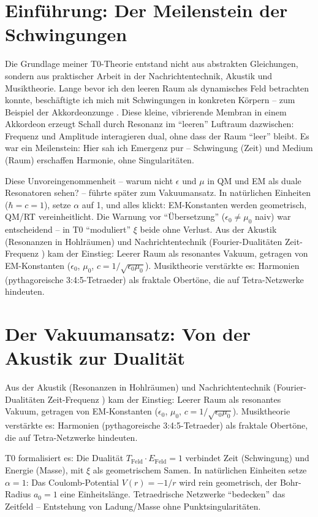 \section{Einführung: Der Meilenstein der Schwingungen}
	Die Grundlage meiner T0-Theorie entstand nicht aus abstrakten Gleichungen, sondern aus praktischer Arbeit in der Nachrichtentechnik, Akustik und Musiktheorie. Lange bevor ich den leeren Raum als dynamisches Feld betrachten konnte, beschäftigte ich mich mit Schwingungen in konkreten Körpern – zum Beispiel der Akkordeonzunge \cite{ricot2005}. Diese kleine, vibrierende Membran in einem Akkordeon erzeugt Schall durch Resonanz im ``leeren'' Luftraum dazwischen: Frequenz und Amplitude interagieren dual, ohne dass der Raum ``leer'' bleibt. Es war ein Meilenstein: Hier sah ich Emergenz pur – Schwingung (Zeit) und Medium (Raum) erschaffen Harmonie, ohne Singularitäten.
	
	Diese Unvoreingenommenheit – warum nicht $\epsilon$ und $\mu$ in QM und EM als duale Resonatoren sehen? – führte später zum Vakuumansatz. In natürlichen Einheiten ($\hbar = c = 1$), setze $\alpha$ auf 1, und alles klickt: EM-Konstanten werden geometrisch, QM/RT vereinheitlicht. Die Warnung vor ``Übersetzung'' ($\epsilon_0 \neq \mu_0$ naiv) war entscheidend – in T0 ``moduliert'' $\xi$ beide ohne Verlust. Aus der Akustik (Resonanzen in Hohlräumen) und Nachrichtentechnik (Fourier-Dualitäten Zeit-Frequenz \cite{stanfordEE261}) kam der Einstieg: Leerer Raum als resonantes Vakuum, getragen von EM-Konstanten ($\epsilon_0$, $\mu_0$, $c = 1/\sqrt{\epsilon_0 \mu_0}$). Musiktheorie verstärkte es: Harmonien (pythagoreische 3:4:5-Tetraeder) als fraktale Obertöne, die auf Tetra-Netzwerke hindeuten.
	
	\section{Der Vakuumansatz: Von der Akustik zur Dualität}
	Aus der Akustik (Resonanzen in Hohlräumen) und Nachrichtentechnik (Fourier-Dualitäten Zeit-Frequenz \cite{stanfordEE261}) kam der Einstieg: Leerer Raum als resonantes Vakuum, getragen von EM-Konstanten ($\epsilon_0$, $\mu_0$, $c = 1/\sqrt{\epsilon_0 \mu_0}$). Musiktheorie verstärkte es: Harmonien (pythagoreische 3:4:5-Tetraeder) als fraktale Obertöne, die auf Tetra-Netzwerke hindeuten.
	
	T0 formalisiert es: Die Dualität $T_{\text{Feld}} \cdot E_{\text{Feld}} = 1$ verbindet Zeit (Schwingung) und Energie (Masse), mit $\xi$ als geometrischem Samen. In natürlichen Einheiten setze $\alpha = 1$: Das Coulomb-Potential $V(r) = -1/r$ wird rein geometrisch, der Bohr-Radius $a_0 = 1$ eine Einheitslänge. Tetraedrische Netzwerke ``bedecken'' das Zeitfeld – Entstehung von Ladung/Masse ohne Punktsingularitäten.
	
